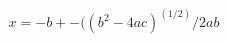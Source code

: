 \documentclass[preview]{standalone}
\begin{document}
\begin{align*}
x=-b +- ((b^2-4ac)^(1/2)/2ab
\end{align*}
\end{document}
